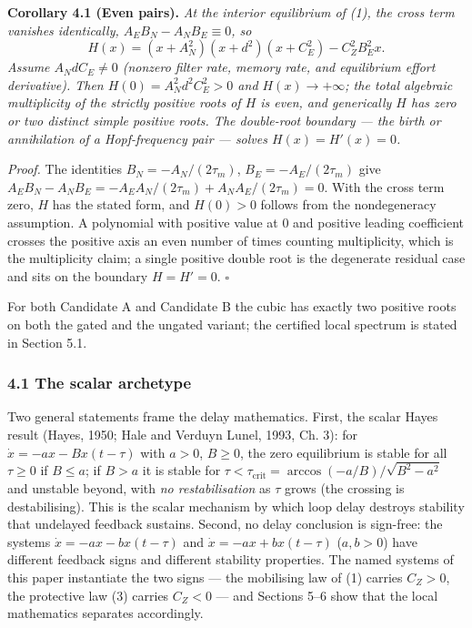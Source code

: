 \documentclass[11pt]{article}
\begin{document}
\textbf{Corollary 4.1 (Even pairs).} \emph{At the interior equilibrium
of (1), the cross term vanishes identically,
\(A_E B_N - A_N B_E \equiv 0\), so}
\[H(x) = (x + A_N^2)(x + d^2)(x + C_E^2) - C_Z^2 B_E^2 x.\] \emph{Assume
\(A_N d C_E \neq 0\) (nonzero filter rate, memory rate, and equilibrium
effort derivative). Then \(H(0) = A_N^2 d^2 C_E^2 > 0\) and
\(H(x) \to +\infty\); the total algebraic multiplicity of the strictly
positive roots of \(H\) is even, and generically \(H\) has zero or two
distinct simple positive roots. The double-root boundary --- the birth
or annihilation of a Hopf-frequency pair --- solves
\(H(x) = H'(x) = 0\).}

\emph{Proof.} The identities \(B_N = -A_N/(2\tau_m)\),
\(B_E = -A_E/(2\tau_m)\) give
\(A_E B_N - A_N B_E = -A_E A_N/(2\tau_m) + A_N A_E/(2\tau_m) = 0\). With
the cross term zero, \(H\) has the stated form, and \(H(0) > 0\) follows
from the nondegeneracy assumption. A polynomial with positive value at
\(0\) and positive leading coefficient crosses the positive axis an even
number of times counting multiplicity, which is the multiplicity claim;
a single positive double root is the degenerate residual case and sits
on the boundary \(H = H' = 0\). \ensuremath{\square}

For both Candidate A and Candidate B the cubic has exactly two positive
roots on both the gated and the ungated variant; the certified local
spectrum is stated in Section 5.1.

\subsubsection{4.1 The scalar archetype}\label{the-scalar-archetype}

Two general statements frame the delay mathematics. First, the scalar
Hayes result (Hayes, 1950; Hale and Verduyn Lunel, 1993, Ch. 3): for
\(\dot x = -ax - Bx(t-\tau)\) with \(a > 0\), \(B \ge 0\), the zero
equilibrium is stable for all \(\tau \ge 0\) if \(B \le a\); if
\(B > a\) it is stable for
\(\tau < \tau_{\mathrm{crit}} = \arccos(-a/B)/\sqrt{B^2 - a^2}\) and
unstable beyond, with \emph{no restabilisation} as \(\tau\) grows (the
crossing is destabilising). This is the scalar mechanism by which loop
delay destroys stability that undelayed feedback sustains. Second, no
delay conclusion is sign-free: the systems \(\dot x = -ax - bx(t-\tau)\)
and \(\dot x = -ax + bx(t-\tau)\) (\(a, b > 0\)) have different feedback
signs and different stability properties. The named systems of this
paper instantiate the two signs --- the mobilising law of (1) carries
\(C_Z > 0\), the protective law (3) carries \(C_Z < 0\) --- and Sections
5--6 show that the local mathematics separates accordingly.
\end{document}
